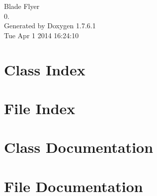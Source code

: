 \documentclass[a4paper]{book}
\begin{document}
\hypersetup{pageanchor=false,citecolor=blue}
\begin{titlepage}
\vspace*{7cm}
\begin{center}
{\Large \-Blade \-Flyer \\[1ex]\large 0. }\\
\vspace*{1cm}
{\large \-Generated by Doxygen 1.7.6.1}\\
\vspace*{0.5cm}
{\small Tue Apr 1 2014 16:24:10}\\
\end{center}
\end{titlepage}
\clearemptydoublepage
{}
\tableofcontents
\clearemptydoublepage
{}
\hypersetup{pageanchor=true,citecolor=blue}
\chapter{\-Class \-Index}

\chapter{\-File \-Index}

\chapter{\-Class \-Documentation}







\chapter{\-File \-Documentation}
















\printindex
\end{document}
